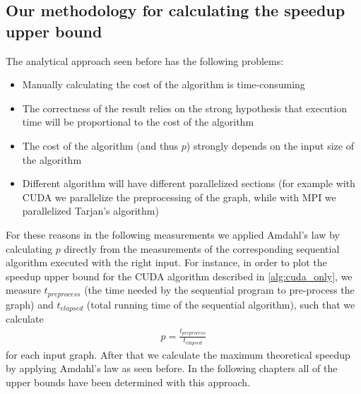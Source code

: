 \subsection{Our methodology for calculating the speedup upper bound}
\noindent The analytical approach seen before has the following problems:
\begin{itemize}
  \item Manually calculating the cost of the algorithm is time-consuming
  \item The correctness of the result relies on the strong hypothesis that execution time will be proportional to the cost of the algorithm
  \item The cost of the algorithm (and thus $p$) strongly depends on the input size of the algorithm
  \item Different algorithm will have different parallelized sections (for example with CUDA we parallelize the preprocessing of the graph, while with MPI we parallelized Tarjan's algorithm)
\end{itemize}
For these reasons in the following measurements we applied Amdahl's law by calculating $p$ directly from the measurements of the corresponding sequential algorithm executed with the right input. For instance, in order to plot the speedup upper bound for the CUDA algorithm described in \ref{alg:cuda_only}, we measure $t_{preprocess}$ (the time needed by the sequential program to pre-process the graph) and $t_{elapsed}$ (total running time of the sequential algorithm), such that we calculate
\begin{align*}
  p = \frac{t_{preprocess}}{t_{elapsed}}
\end{align*}
for each input graph. After that we calculate the maximum theoretical speedup by applying Amdahl's law as seen before. In the following chapters all of the upper bounds have been determined with this approach.

